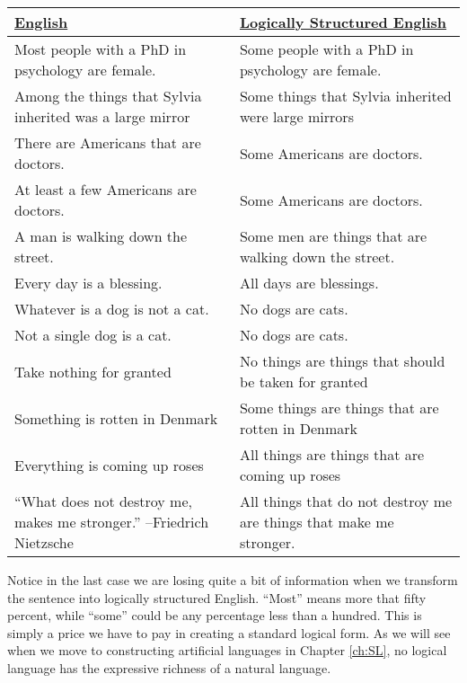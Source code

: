 \begin{table*}[!ht]
\begin{longtabu}{p{.5\linewidth}p{.5\linewidth}}
\underline{English} &
\underline{Logically Structured English} \\
\endhead

Most people with a PhD in psychology are female. &
Some people with a PhD in psychology are female. \\

Among the things that Sylvia inherited was a large mirror &
Some things that Sylvia inherited were large mirrors\\

There are Americans that are doctors. &
Some Americans are doctors. \\

At least a few Americans are doctors.&
Some Americans are doctors. \\

A man is walking down the street. &
Some men are things that are walking down the street.\\

Every day is a blessing. &
All days are blessings. \\

Whatever is a dog is not a cat. &
No dogs are cats. \\

Not a single dog is a cat. &
No dogs are cats. \\

Take nothing for granted &
No things are things that should be taken for granted \\

Something is rotten in Denmark &
Some things are things that are rotten in Denmark\\

Everything is coming up roses &
All things are things that are coming up roses\\

``What does not destroy me, makes me stronger.'' --Friedrich Nietzsche &
All things that do not destroy me are things that make me stronger. \\
\end{longtabu}
\end{table*}

Notice in the last case we are losing quite a bit of information when we transform the sentence into logically structured English. ``Most'' means more that fifty percent, while ``some'' could be any percentage less than a hundred. This is simply a price we have to pay in creating a standard logical form. As we will see when we move to constructing artificial languages in Chapter \ref{ch:SL}, no logical language has the expressive richness of a natural language.

